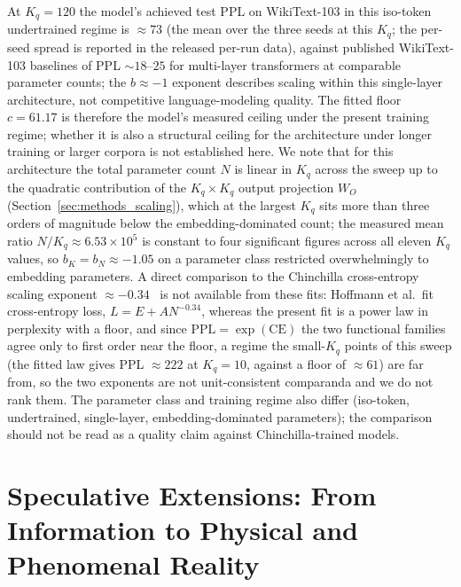 \documentclass[11pt]{article}
\begin{document}
At $K_q = 120$ the model's achieved test PPL on WikiText-103 in this iso-token undertrained regime is $\approx 73$ (the mean over the three seeds at this $K_q$; the per-seed spread is reported in the released per-run data), against published WikiText-103 baselines of PPL $\sim 18$--$25$ for multi-layer transformers at comparable parameter counts; the $b \approx -1$ exponent describes scaling within this single-layer architecture, not competitive language-modeling quality. The fitted floor $c = 61.17$ is therefore the model's measured ceiling under the present training regime; whether it is also a structural ceiling for the architecture under longer training or larger corpora is not established here. We note that for this architecture the total parameter count $N$ is linear in $K_q$ across the sweep up to the quadratic contribution of the $K_q \times K_q$ output projection $W_O$ (Section~\ref{sec:methods_scaling}), which at the largest $K_q$ sits more than three orders of magnitude below the embedding-dominated count; the measured mean ratio $N/K_q \approx 6.53\times 10^5$ is constant to four significant figures across all eleven $K_q$ values, so $b_K = b_N \approx -1.05$ on a parameter class restricted overwhelmingly to embedding parameters. A direct comparison to the Chinchilla cross-entropy scaling exponent $\approx -0.34$~\cite{HoffmannChinchilla2022} is not available from these fits: Hoffmann et al.\ fit cross-entropy loss, $L = E + AN^{-0.34}$, whereas the present fit is a power law in perplexity with a floor, and since $\mathrm{PPL} = \exp(\mathrm{CE})$ the two functional families agree only to first order near the floor, a regime the small-$K_q$ points of this sweep (the fitted law gives PPL $\approx 222$ at $K_q = 10$, against a floor of $\approx 61$) are far from, so the two exponents are not unit-consistent comparanda and we do not rank them. The parameter class and training regime also differ (iso-token, undertrained, single-layer, embedding-dominated parameters); the comparison should not be read as a quality claim against Chinchilla-trained models.

\section{Speculative Extensions: From Information to Physical and Phenomenal Reality}
\label{sec:speculative_extensions}
\end{document}
